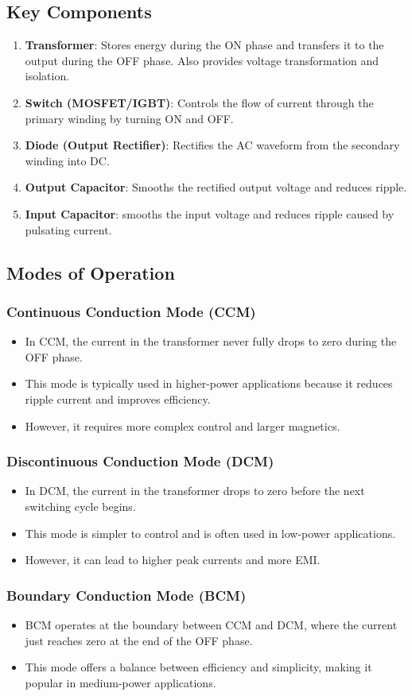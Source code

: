 \subsection{Key Components}
\begin{enumerate}
    \item \textbf{Transformer}: Stores energy during the ON phase and transfers it to the output during the OFF phase. Also provides voltage transformation and isolation.
    \item \textbf{Switch (MOSFET/IGBT)}: Controls the flow of current through the primary winding by turning ON and OFF.
    \item  \textbf{Diode (Output Rectifier)}: Rectifies the AC waveform from the secondary winding into DC.
    \item \textbf{Output Capacitor}:  Smooths the rectified output voltage and reduces ripple.
    \item \textbf{Input Capacitor}: smooths the input voltage and reduces ripple caused by pulsating current.
\end{enumerate}
\subsection{Modes of Operation}
\subsubsection*{Continuous Conduction Mode (CCM)}
\begin{itemize}
    \item In CCM, the current in the transformer never fully drops to zero during the OFF phase.
    \item This mode is typically used in higher-power applications because it reduces ripple current and improves efficiency.
    \item However, it requires more complex control and larger magnetics.
\end{itemize}
\subsubsection*{Discontinuous Conduction Mode (DCM)}
\begin{itemize}
    \item In DCM, the current in the transformer drops to zero before the next switching cycle begins.
    \item This mode is simpler to control and is often used in low-power applications.
    \item However, it can lead to higher peak currents and more EMI.
\end{itemize}
\subsubsection*{Boundary Conduction Mode (BCM)}
\begin{itemize}
    \item BCM operates at the boundary between CCM and DCM, where the current just reaches zero at the end of the OFF phase.
    \item This mode offers a balance between efficiency and simplicity, making it popular in medium-power applications.
\end{itemize}
